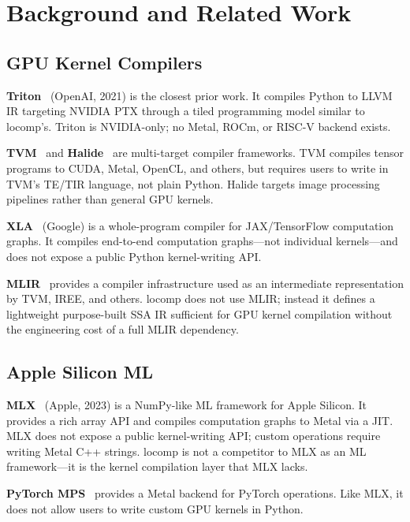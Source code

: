 \documentclass[10pt,twocolumn]{article}
\begin{document}
\section{Background and Related Work}
\label{sec:related}

\subsection{GPU Kernel Compilers}

\textbf{Triton}~\cite{triton} (OpenAI, 2021) is the closest prior work. It
compiles Python to LLVM IR targeting NVIDIA PTX through a tiled programming
model similar to locomp's. Triton is NVIDIA-only; no Metal, ROCm, or RISC-V
backend exists.

\textbf{TVM}~\cite{tvm} and \textbf{Halide}~\cite{halide} are multi-target
compiler frameworks. TVM compiles tensor programs to CUDA, Metal, OpenCL, and
others, but requires users to write in TVM's TE/TIR language,
not plain Python. Halide targets image processing pipelines rather than
general GPU kernels.

\textbf{XLA}~\cite{xla} (Google) is a whole-program compiler for JAX/TensorFlow
computation graphs. It compiles end-to-end computation graphs---not individual
kernels---and does not expose a public Python kernel-writing API.

\textbf{MLIR}~\cite{mlir} provides a compiler infrastructure used as an
intermediate representation by TVM, IREE, and others. locomp does not use
MLIR; instead it defines a lightweight purpose-built SSA IR sufficient for GPU
kernel compilation without the engineering cost of a full MLIR dependency.

\subsection{Apple Silicon ML}

\textbf{MLX}~\cite{mlx} (Apple, 2023) is a NumPy-like ML framework for Apple
Silicon. It provides a rich array API and compiles computation graphs to Metal
via a JIT. MLX does not expose a public kernel-writing API; custom operations
require writing Metal C++ strings. locomp is not a competitor to MLX as an ML
framework---it is the kernel compilation layer that MLX lacks.

\textbf{PyTorch MPS}~\cite{pytorch} provides a Metal backend for PyTorch
operations. Like MLX, it does not allow users to write custom GPU kernels in
Python.
\end{document}
